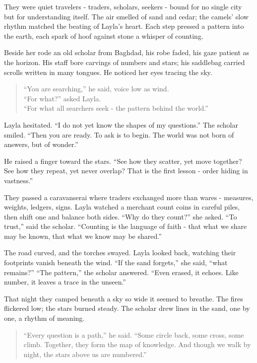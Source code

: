 \documentclass[
  letterpaper,
  DIV=11,
  numbers=noendperiod]{scrreprt}
\begin{document}
They were quiet travelers - traders, scholars, seekers - bound for no
single city but for understanding itself. The air smelled of sand and
cedar; the camels' slow rhythm matched the beating of Layla's heart.
Each step pressed a pattern into the earth, each spark of hoof against
stone a whisper of counting.

Beside her rode an old scholar from Baghdad, his robe faded, his gaze
patient as the horizon. His staff bore carvings of numbers and stars;
his saddlebag carried scrolls written in many tongues. He noticed her
eyes tracing the sky.

\begin{quote}
``You are searching,'' he said, voice low as wind.\\
``For what?'' asked Layla.\\
``For what all searchers seek - the pattern behind the world.''
\end{quote}

Layla hesitated. ``I do not yet know the shapes of my questions.'' The
scholar smiled. ``Then you are ready. To ask is to begin. The world was
not born of answers, but of wonder.''

He raised a finger toward the stars. ``See how they scatter, yet move
together? See how they repeat, yet never overlap? That is the first
lesson - order hiding in vastness.''

They passed a caravanserai where traders exchanged more than wares -
measures, weights, ledgers, signs. Layla watched a merchant count coins
in careful piles, then shift one and balance both sides. ``Why do they
count?'' she asked. ``To trust,'' said the scholar. ``Counting is the
language of faith - that what we share may be known, that what we know
may be shared.''

The road curved, and the torches swayed. Layla looked back, watching
their footprints vanish beneath the wind. ``If the sand forgets,'' she
said, ``what remains?'' ``The pattern,'' the scholar answered. ``Even
erased, it echoes. Like number, it leaves a trace in the unseen.''

That night they camped beneath a sky so wide it seemed to breathe. The
fires flickered low; the stars burned steady. The scholar drew lines in
the sand, one by one, a rhythm of meaning.

\begin{quote}
``Every question is a path,'' he said. ``Some circle back, some cross,
some climb. Together, they form the map of knowledge. And though we walk
by night, the stars above us are numbered.''
\end{quote}
\end{document}
